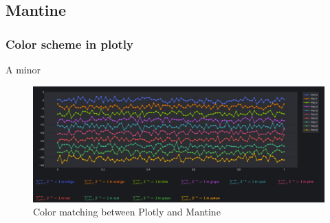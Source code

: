 \subsection{Mantine}

\subsubsection{Color scheme in plotly}
A minor
\begin{figure}[H]
    \centering
    \includegraphics[width=\textwidth]{figures/gui/colors.png}
    \caption{Color matching between Plotly and Mantine}
    \label{fig:color_matching}
\end{figure}